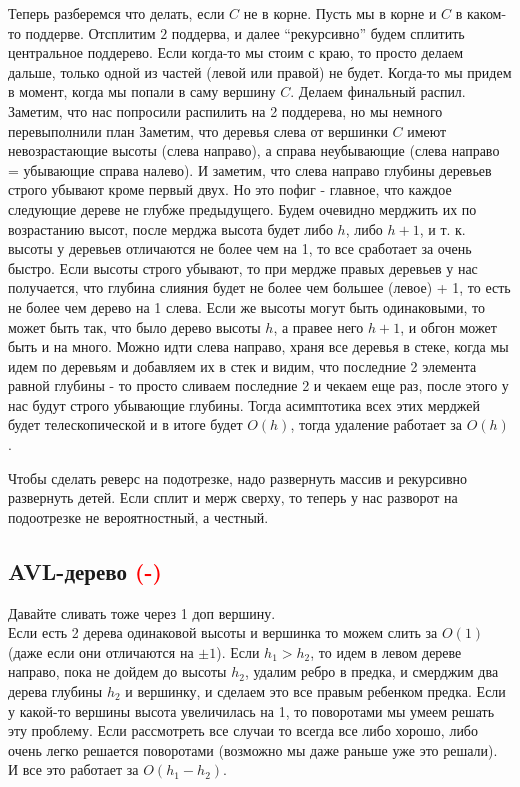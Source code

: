 Теперь разберемся что делать, если $C$ не в корне. Пусть мы в корне и $C$ в каком-то поддерве. Отсплитим $2$ поддерва, и далее ``рекурсивно'' будем сплитить центральное поддерево. Если когда-то мы стоим с краю, то просто делаем дальше, только одной из частей (левой или правой) не будет. Когда-то мы придем в момент, когда мы попали в саму вершину $C$. Делаем финальный распил. Заметим, что нас попросили распилить на 2 поддерева, но мы немного перевыполнили план %
Заметим, что деревья слева от вершинки $C$ имеют невозрастающие высоты (слева направо), а справа неубывающие (слева направо = убывающие справа налево). И заметим, что слева направо глубины деревьев строго убывают кроме первый двух. Но это пофиг - главное, что каждое следующие дереве не глубже предыдущего. Будем очевидно мерджить их по возрастанию высот, после мерджа высота будет либо $h$, либо $h + 1$, и т. к. высоты у деревьев отличаются не более чем на 1, то все сработает за очень быстро. %
Если высоты строго убывают, то при мердже правых деревьев у нас получается, что глубина слияния будет не более чем большее (левое) + 1, то есть не более чем дерево на 1 слева. Если же высоты могут быть одинаковыми, то может быть так, что было дерево высоты $h$, а правее него $h+1$, и обгон может быть и на много. Можно идти слева направо, храня все деревья в стеке, когда мы идем по деревьям и добавляем их в стек и видим, что последние 2 элемента равной глубины - то просто сливаем последние 2 и чекаем еще раз, после этого у нас будут строго убывающие глубины. Тогда асимптотика всех этих мерджей будет телескопической и в итоге будет $O(h)$, тогда удаление работает за $O(h)$.

Чтобы сделать реверс на подотрезке, надо развернуть массив и рекурсивно развернуть детей. Если сплит и мерж сверху, то теперь у нас разворот на подоотрезке не вероятностный, а честный.


\subsection{AVL-дерево \textcolor{red}{(-)}}


Давайте сливать тоже через 1 доп вершину. \\
Если есть 2 дерева одинаковой высоты и вершинка то можем слить за $O(1)$ (даже если они отличаются на $\pm 1$). Если $h_1 > h_2$, то идем в левом дереве направо, пока не дойдем до высоты $h_2$, удалим ребро в предка, и смерджим два дерева глубины $h_2$ и вершинку, и сделаем это все правым ребенком предка. %
Если у какой-то вершины высота увеличилась на 1, то поворотами мы умеем решать эту проблему. Если рассмотреть все случаи то всегда все либо хорошо, либо очень легко решается поворотами (возможно мы даже раньше уже это решали). И все это работает за $O(h_1 - h_2)$.


